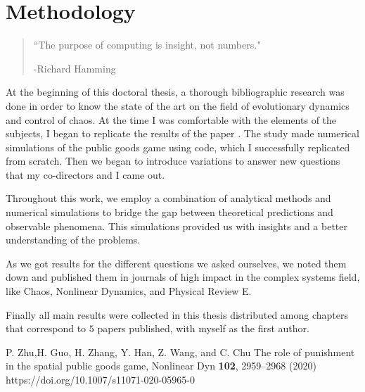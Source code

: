 \chapter{Methodology}
\label{chap:Method}


\begin{quotation}


	\vspace{-3cm}


    \begin{flushright}
    \begin{minipage}[t][5cm][b]{0.5\textwidth}
    { ``The purpose of computing is insight, not numbers."}
    
    \bigskip
    
    -{\small  Richard Hamming}
    \end{minipage}
    \end{flushright}
    
    \vspace{0.5cm}
\end{quotation}


At the beginning of this doctoral thesis, a thorough bibliographic research was done in order to know the state of the art on the field of evolutionary dynamics and control of chaos. At the time I was comfortable with the elements of the subjects, I began to replicate the results of the paper \cite{Replicate}. The study made numerical simulations of the public goods game using code, which I successfully replicated from scratch. Then we began to introduce variations to answer new questions that my co-directors and I came out.


Throughout this work, we employ a combination of analytical methods and numerical simulations to bridge the gap between theoretical predictions and observable phenomena. This simulations provided us with insights and a better understanding of the problems.

As we got results for the different questions we asked ourselves, we noted them down and published them in journals of high impact in the complex systems field, like Chaos, Nonlinear Dynamics, and Physical Review E.

Finally all main results were collected in this thesis distributed among chapters that correspond to $5$ papers published, with myself as the first author.

\begin{thebibliography}{02}


P. Zhu,H. Guo, H. Zhang, Y. Han, Z. Wang, and C. Chu
The role of punishment in the spatial public goods game,
Nonlinear Dyn \textbf{102}, 2959--2968 (2020) 
https://doi.org/10.1007/s11071-020-05965-0




\end{thebibliography}
